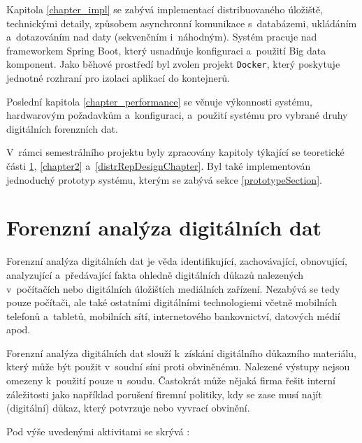 Kapitola \ref{chapter_impl} se zabývá implementací distribuovaného úložiště,  technickými detaily, způsobem asynchronní komunikace s~databázemi, ukládáním a~dotazováním nad daty (sekvenčním i~náhodným). Systém pracuje nad frameworkem Spring Boot, který usnadňuje konfiguraci a~použití Big data komponent. Jako běhové prostředí byl zvolen projekt \texttt{Docker}, který poskytuje jednotné rozhraní pro izolaci aplikací do kontejnerů.

Poslední kapitola \ref{chapter_performance} se věnuje výkonnosti systému, hardwarovým požadavkům a~konfiguraci, a~použití systému pro vybrané druhy digitálních forenzních dat.

V~rámci semestrálního projektu byly zpracovány kapitoly týkající se teoretické části \ref{chapter1}, \ref{chapter2} a~\ref{distrRepDesignChapter}. Byl také implementován jednoduchý prototyp systému, kterým se zabývá sekce \ref{prototypeSection}.

\chapter{Forenzní analýza digitálních dat} \label{chapter1}
Forenzní analýza digitálních dat je věda identifikující, zachovávající, obnovující, analyzující a~předávající fakta ohledně digitálních důkazů nalezených v~počítačích nebo digitálních úložištích mediálních zařízení.
Nezabývá se tedy pouze počítači, ale také ostatními digitálními technologiemi včetně mobilních telefonů a~tabletů, mobilních sítí, internetového bankovnictví, datových médií apod.

Forenzní analýza digitálních dat slouží k~získání digitálního důkazního materiálu, který může být použit v~soudní síni proti obviněnému. Nalezené výstupy nejsou omezeny k~použití pouze u~soudu. Častokrát může nějaká firma řešit interní záležitosti jako například porušení firemní politiky, kdy se zase musí najít (digitální) důkaz, který potvrzuje nebo vyvrací obvinění.

Pod výše uvedenými aktivitami se skrývá \cite{whatIsDigFor}:


